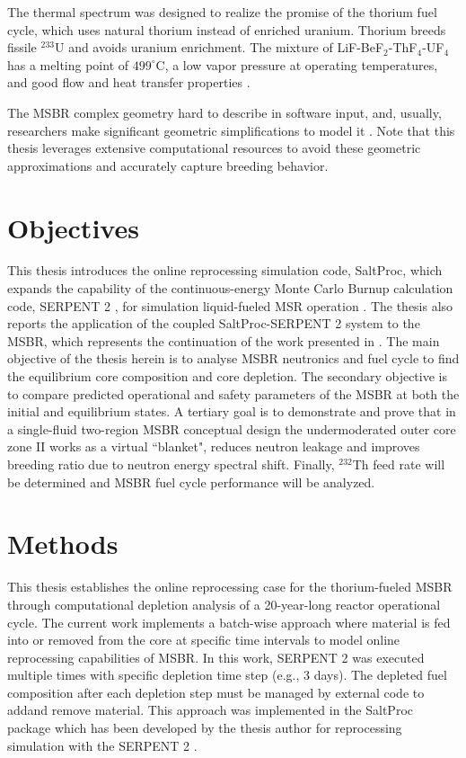 The thermal spectrum  was designed to realize the promise of the thorium fuel cycle, which uses natural thorium instead of enriched uranium. Thorium breeds fissile $^{233}$U and avoids uranium enrichment. The mixture of LiF-BeF$_2$-ThF$_4$-UF$_4$ has a melting point of $499^\circ$C, a low vapor pressure at operating temperatures, and good flow and heat transfer properties \cite{robertson_conceptual_1971}. 

The \gls{MSBR} complex geometry hard to describe in software input, and, usually, researchers make significant geometric simplifications to model it \cite{park_whole_2015}. Note that this thesis leverages extensive computational resources to avoid these geometric approximations and accurately capture breeding behavior.

\section{Objectives}
This thesis introduces the online reprocessing simulation code, SaltProc, which expands the capability of the continuous-energy Monte Carlo Burnup calculation code, SERPENT 2 \cite{leppanen_serpent_2015}, for simulation liquid-fueled \gls{MSR} operation \cite{andrei_rykhlevskii_arfc/saltproc:_2018}. The thesis also reports the application of the coupled SaltProc-SERPENT 2 system to the \gls{MSBR}, which represents the continuation of the work presented in \cite{rykhlevskii_full-core_2017, rykhlevskii_online_2017}. The main objective of the thesis herein is to analyse \gls{MSBR} neutronics and fuel cycle to find the equilibrium core composition and core depletion. The secondary objective is to compare predicted operational and safety parameters of the \gls{MSBR} at both the initial and equilibrium states. A tertiary goal is to demonstrate and prove that in a single-fluid two-region \gls{MSBR} conceptual design the undermoderated outer core zone II works as a virtual ``blanket", reduces neutron leakage and improves breeding ratio due to neutron energy spectral shift. Finally, $^{232}$Th feed rate will be determined and \gls{MSBR} fuel cycle performance will be analyzed.

\section{Methods}
This thesis establishes the online reprocessing case for the thorium-fueled \gls{MSBR} through computational depletion analysis of a 20-year-long reactor operational cycle. The current work implements a batch-wise approach where material is fed into or removed from the core at specific time intervals to model online reprocessing capabilities of \gls{MSBR}. In this work, SERPENT 2 was executed multiple times with specific depletion time step (e.g., 3 days). The depleted fuel composition after each depletion step  must be managed by external code to addand remove material. This approach was implemented in the SaltProc package \cite{andrei_rykhlevskii_arfc/saltproc:_2018} which has been developed by the thesis author for reprocessing simulation with the SERPENT 2 \cite{leppanen_serpent_2015}. 

